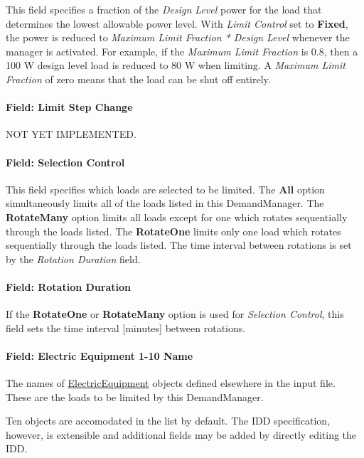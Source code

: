 This field specifies a fraction of the \emph{Design Level} power for the load that determines the lowest allowable power level. With \emph{Limit Control} set to \textbf{Fixed}, the power is reduced to \emph{Maximum Limit Fraction * Design Level} whenever the manager is activated. For example, if the \emph{Maximum Limit Fraction} is 0.8, then a 100 W design level load is reduced to 80 W when limiting. A \emph{Maximum Limit Fraction} of zero means that the load can be shut off entirely.

\paragraph{Field: Limit Step Change}\label{field-limit-step-change-2}

NOT YET IMPLEMENTED.

\paragraph{Field: Selection Control}\label{field-selection-control-2}

This field specifies which loads are selected to be limited. The \textbf{All} option simultaneously limits all of the loads listed in this DemandManager. The \textbf{RotateMany} option limits all loads except for one which rotates sequentially through the loads listed. The \textbf{RotateOne} limits only one load which rotates sequentially through the loads listed. The time interval between rotations is set by the \emph{Rotation Duration} field.

\paragraph{Field: Rotation Duration}\label{field-rotation-duration-2}

If the \textbf{RotateOne} or \textbf{RotateMany} option is used for \emph{Selection Control}, this field sets the time interval {[}minutes{]} between rotations.

\paragraph{Field: Electric Equipment 1-10 Name}\label{field-electric-equipment-1-10-name}

The names of \hyperref[electricequipment]{ElectricEquipment} objects defined elsewhere in the input file. These are the loads to be limited by this DemandManager.

Ten objects are accomodated in the list by default. The IDD specification, however, is extensible and additional fields may be added by directly editing the IDD.

